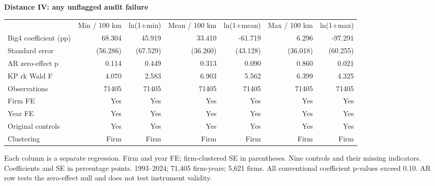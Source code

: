 \documentclass[10pt]{article}
\begin{document}
\setlength{\tabcolsep}{4pt}\renewcommand{\arraystretch}{1.1}
\noindent\textbf{Distance IV: any unflagged audit failure}\par\medskip
\begin{tabular}{lrrrrrr}
\hline
 & Min / 100 km & ln(1+min) & Mean / 100 km & ln(1+mean) & Max / 100 km & ln(1+max) \\
Big4 coefficient (pp) & 68.304 & 45.919 & 33.410 & -61.719 & 6.296 & -97.291 \\
Standard error & (56.286) & (67.529) & (36.260) & (43.128) & (36.018) & (60.255) \\
AR zero-effect p & 0.114 & 0.449 & 0.313 & 0.090 & 0.860 & 0.021 \\
KP rk Wald F & 4.070 & 2.583 & 6.903 & 5.562 & 6.399 & 4.325 \\
Observations & 71405 & 71405 & 71405 & 71405 & 71405 & 71405 \\
Firm FE & Yes & Yes & Yes & Yes & Yes & Yes \\
Year FE & Yes & Yes & Yes & Yes & Yes & Yes \\
Original controls & Yes & Yes & Yes & Yes & Yes & Yes \\
Clustering & Firm & Firm & Firm & Firm & Firm & Firm \\
\hline
\end{tabular}

\par\medskip\noindent\begin{minipage}{26cm}Each column is a separate regression. Firm and year FE; firm-clustered SE in parentheses. Nine controls and their missing indicators. Coefficients and SE in percentage points. 1993--2024; 71,405 firm-years; 5,621 firms. All conventional coefficient p-values exceed 0.10. AR row tests the zero-effect null and does not test instrument validity. \end{minipage}
\end{document}
